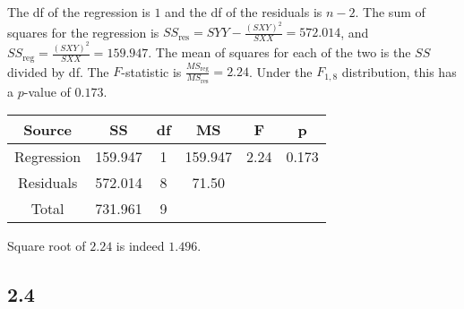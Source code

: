 \documentclass{article}
\begin{document}
The df of the regression is $1$ and the df of the residuals is $n-2$. The sum of squares for the regression is $SS_\text{res}=SYY-\frac{(SXY)^2}{SXX}=572.014$, and $SS_\text{reg}=\frac{(SXY)^2}{SXX}=159.947$. The mean of squares for each of the two is the $SS$ divided by df. The $F$-statistic is $\frac{MS_\text{reg}}{MS_\text{res}}=2.24$. Under the $F_{1,8}$ distribution, this has a $p$-value of $0.173$.

\begin{tabular}{cccccc}
\hline
Source & SS & df & MS & F & p\\
\hline
Regression & 159.947 & 1 & 159.947 & 2.24 & 0.173\\
Residuals & 572.014 & 8 & 71.50 \\
Total & 731.961& 9\\
\end{tabular}

Square root of $2.24$ is indeed $1.496$.

\subsection*{2.4}
\end{document}
